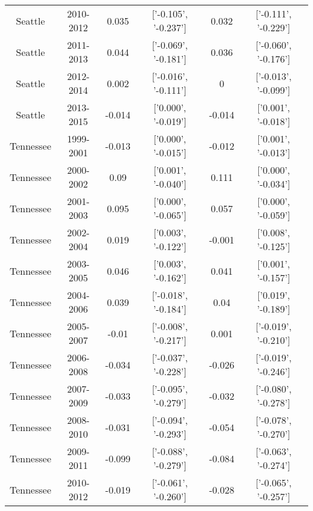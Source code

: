 \documentclass[utf8]{FrontiersinHarvard} %
\begin{document}
\begin{table}[h]
\begin{tabular}{|c|c|c|c|c|c|}
		Seattle   & 2010-2012        & 0.035                          & ['-0.105', '-0.237']           & 0.032  & ['-0.111', '-0.229'] \\
		Seattle   & 2011-2013        & 0.044                          & ['-0.069', '-0.181']           & 0.036  & ['-0.060', '-0.176'] \\
		Seattle   & 2012-2014        & 0.002                          & ['-0.016', '-0.111']           & 0      & ['-0.013', '-0.099'] \\
		Seattle   & 2013-2015        & -0.014                         & ['0.000', '-0.019']            & -0.014 & ['0.001', '-0.018']  \\
		\midrule
		Tennessee & 1999-2001        & -0.013                         & ['0.000', '-0.015']            & -0.012 & ['0.001', '-0.013']  \\
		Tennessee & 2000-2002        & 0.09                           & ['0.001', '-0.040']            & 0.111  & ['0.000', '-0.034']  \\
		Tennessee & 2001-2003        & 0.095                          & ['0.000', '-0.065']            & 0.057  & ['0.000', '-0.059']  \\
		Tennessee & 2002-2004        & 0.019                          & ['0.003', '-0.122']            & -0.001 & ['0.008', '-0.125']  \\
		Tennessee & 2003-2005        & 0.046                          & ['0.003', '-0.162']            & 0.041  & ['0.001', '-0.157']  \\
		Tennessee & 2004-2006        & 0.039                          & ['-0.018', '-0.184']           & 0.04   & ['0.019', '-0.189']  \\
		Tennessee & 2005-2007        & -0.01                          & ['-0.008', '-0.217']           & 0.001  & ['-0.019', '-0.210'] \\
		Tennessee & 2006-2008        & -0.034                         & ['-0.037', '-0.228']           & -0.026 & ['-0.019', '-0.246'] \\
		Tennessee & 2007-2009        & -0.033                         & ['-0.095', '-0.279']           & -0.032 & ['-0.080', '-0.278'] \\
		Tennessee & 2008-2010        & -0.031                         & ['-0.094', '-0.293']           & -0.054 & ['-0.078', '-0.270'] \\
		Tennessee & 2009-2011        & -0.099                         & ['-0.088', '-0.279']           & -0.084 & ['-0.063', '-0.274'] \\
		Tennessee & 2010-2012        & -0.019                         & ['-0.061', '-0.260']           & -0.028 & ['-0.065', '-0.257'] \\

\end{tabular}
\end{table}
\end{document}
